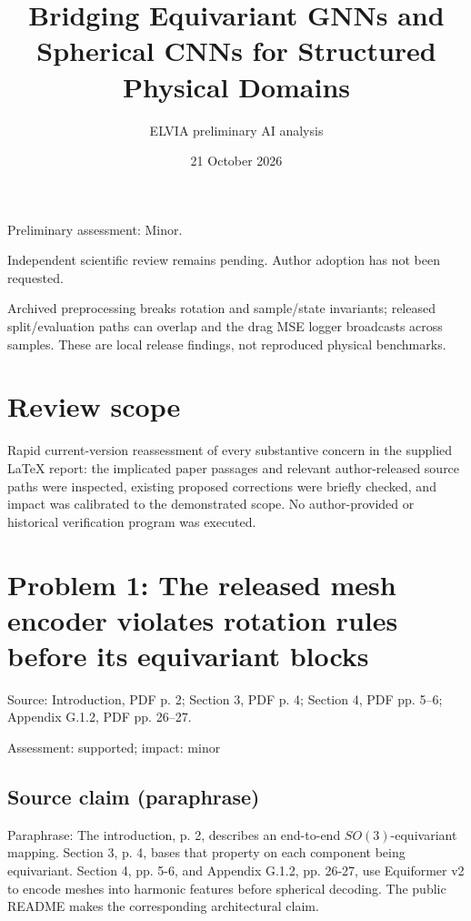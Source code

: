 \documentclass[11pt]{article}
\begin{document}
\title{Bridging Equivariant GNNs and Spherical CNNs for Structured Physical Domains}

\author{ELVIA preliminary AI analysis}\date{21 October 2026}\maketitle

Preliminary assessment: Minor.\par

Independent scientific review remains pending. Author adoption has not been requested.

Archived preprocessing breaks rotation and sample/state invariants; released split/evaluation paths can overlap and the drag MSE logger broadcasts across samples. These are local release findings, not reproduced physical benchmarks.

\section*{Review scope}

Rapid current-version reassessment of every substantive concern in the supplied LaTeX report: the implicated paper passages and relevant author-released source paths were inspected, existing proposed corrections were briefly checked, and impact was calibrated to the demonstrated scope. No author-provided or historical verification program was executed.

\section*{Problem 1: The released mesh encoder violates rotation rules before its equivariant blocks}

Source: Introduction, PDF p. 2; Section 3, PDF p. 4; Section 4, PDF pp. 5–6; Appendix G.1.2, PDF pp. 26–27.

Assessment: supported; impact: minor

\subsection*{Source claim (paraphrase)}

Paraphrase: The introduction, p. 2, describes an end-to-end \(SO(3)\)-equivariant mapping. Section 3, p. 4, bases that property on each component being equivariant. Section 4, pp. 5-6, and Appendix G.1.2, pp. 26-27, use Equiformer v2 to encode meshes into harmonic features before spherical decoding. The public README makes the corresponding architectural claim.
\end{document}
